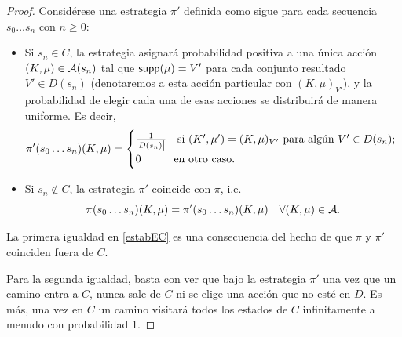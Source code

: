 \begin{proof}
	Considérese una estrategia $\pi'$ definida como sigue para cada secuencia $s_0 \dots s_n$ con $n \geq 0$:

	\begin{itemize}
		\item Si $s_n \in C$, la estrategia asignará probabilidad positiva a una única acción
		      $(K, \mu) \in \mathcal{A}(s_n)$ tal que $\textsf{supp}(\mu)=V'$ para cada conjunto resultado
		      $V' \in D(s_n)$ (denotaremos a esta acción particular con $(K, \mu)_{V'}$), y
		      la probabilidad de elegir cada una de esas acciones se distribuirá de manera
		      uniforme. Es decir,
		      \[
			      \pi'(s_0 \dots s_n)(K, \mu) =
			      \begin{cases}
				      \frac{1}{\abs{D(s_n)}} \quad \text{si } (K', \mu') = (K, \mu)_{V'} \text{ para algún } V' \in D(s_n); \\
				      0 \qquad \quad \text{en otro caso}.
			      \end{cases}
		      \]

		\item Si $s_n \notin C$, la estrategia $\pi'$ coincide con $\pi$, i.e.
		      \[
			      \pi(s_0 \dots s_n)(K, \mu) = \pi'(s_0\dots s_n)(K, \mu) \quad \forall (K, \mu) \in \mathcal{A}.
		      \]

	\end{itemize}

	La primera igualdad en \ref{estabEC} es una consecuencia del hecho de que $\pi$
	y $\pi'$ coinciden fuera de $C$.

	Para la segunda igualdad, basta con ver que bajo la estrategia $\pi'$ una vez
	que un camino entra a $C$, nunca sale de $C$ ni se elige una acción que no esté
	en $D$. Es más, una vez en $C$ un camino visitará todos los estados de $C$
	infinitamente a menudo con probabilidad 1.
\end{proof}



